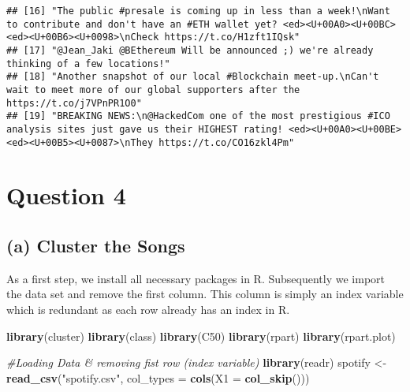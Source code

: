\documentclass[]{article}
\newenvironment{Shaded}{\begin{snugshade}}{\end{snugshade}}
\newcommand{\KeywordTok}[1]{\textcolor[rgb]{0.13,0.29,0.53}{\textbf{#1}}}
\newcommand{\DataTypeTok}[1]{\textcolor[rgb]{0.13,0.29,0.53}{#1}}
\newcommand{\StringTok}[1]{\textcolor[rgb]{0.31,0.60,0.02}{#1}}
\newcommand{\CommentTok}[1]{\textcolor[rgb]{0.56,0.35,0.01}{\textit{#1}}}
\newcommand{\NormalTok}[1]{#1}
\begin{document}
\begin{verbatim}
## [16] "The public #presale is coming up in less than a week!\nWant to contribute and don't have an #ETH wallet yet? <ed><U+00A0><U+00BC><ed><U+00B6><U+0098>\nCheck https://t.co/H1zft1IQsk"
## [17] "@Jean_Jaki @BEthereum Will be announced ;) we're already thinking of a few locations!"                                                                         
## [18] "Another snapshot of our local #Blockchain meet-up.\nCan't wait to meet more of our global supporters after the https://t.co/j7VPnPR1O0"                       
## [19] "BREAKING NEWS:\n@HackedCom one of the most prestigious #ICO analysis sites just gave us their HIGHEST rating! <ed><U+00A0><U+00BE><ed><U+00B5><U+0087>\nThey https://t.co/CO16zkl4Pm"
\end{verbatim}

\section{Question 4}\label{question-4}

\subsection{(a) Cluster the Songs}\label{a-cluster-the-songs}

As a first step, we install all necessary packages in R. Subsequently we
import the data set and remove the first column. This column is simply
an index variable which is redundant as each row already has an index in
R.

\begin{Shaded}
\begin{Highlighting}[]
\KeywordTok{library}\NormalTok{(cluster)}
\KeywordTok{library}\NormalTok{(class)  }
\KeywordTok{library}\NormalTok{(C50)}
\KeywordTok{library}\NormalTok{(rpart)}
\KeywordTok{library}\NormalTok{(rpart.plot)}
\end{Highlighting}
\end{Shaded}

\begin{Shaded}
\begin{Highlighting}[]
\CommentTok{#Loading Data & removing fist row (index variable)}
\KeywordTok{library}\NormalTok{(readr)}
\NormalTok{spotify <-}\StringTok{ }\KeywordTok{read_csv}\NormalTok{(}\StringTok{"spotify.csv"}\NormalTok{, }\DataTypeTok{col_types =} \KeywordTok{cols}\NormalTok{(}\DataTypeTok{X1 =} \KeywordTok{col_skip}\NormalTok{()))}
\end{Highlighting}
\end{Shaded}
\end{document}
